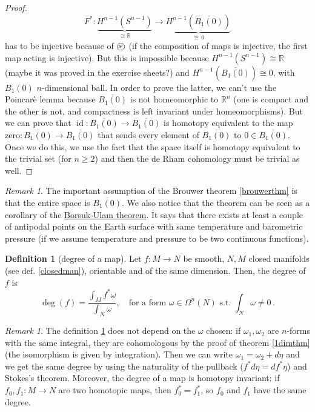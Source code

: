 \documentclass[a4paper,11pt,titlepage, article, oneside]{memoir}
\numberwithin{equation}{section}
\theoremstyle{definition}
\newtheorem{definition}[theorem]{Definition}
\theoremstyle{remark}
\newtheorem{remark}[theorem]{Remark}
\DeclareMathOperator{\id}{id}
\newcommand{\rfield}{\mathbb{R}}
\newcommand\oast{\stackMath\mathbin{\stackinset{c}{0ex}{c}{0ex}{\ast}{\bigcirc}}}
\begin{document}
\begin{proof}
$$F^* \colon \underbrace{H^{n-1}(S^{n-1})}_{\cong \rfield} \longrightarrow \underbrace{H^{n-1}(\overline{B_1(0)})}_{\cong \,0}$$
has to be injective because of $\oast$ (if the composition of maps is injective, the first map acting is injective). But this is impossible because $H^{n-1}(S^{n-1}) \cong \rfield$ (maybe it was proved in the exercise sheets?) and $H^{n-1}(\overline{B_1(0)}) \cong 0$, with $B_1(0)$ $n$-dimensional ball. In order to prove the latter, we can't use the Poincarè lemma because $\overline{B_1(0)}$ is not homeomorphic to $\rfield^n$ (one is compact and the other is not, and compactness is left invariant under homeomorphisms). But we can prove that $\id \colon \overline{B_1(0)} \rightarrow \overline{B_1(0)}$ is homotopy equivalent to the map $\text{zero} \colon \overline{B_1(0)} \rightarrow \overline{B_1(0)}$ that sends every element of $\overline{B_1(0)}$ to $0 \in \overline{B_1(0)}$. Once we do this, we use the fact that the space itself is homotopy equivalent to the trivial set (for $n \ge 2$) and then the de Rham cohomology must be trivial as well.
\end{proof}

\begin{remarkbox}\begin{remark}
The important assumption of the Brouwer theorem \ref{brouwerthm} is that the entire space is $\overline{B_1(0)}$. We also notice that the theorem can be seen as a corollary of the \href{https://en.wikipedia.org/wiki/Borsuk-Ulam_theorem}{Borsuk-Ulam theorem}. It says that there exists at least a couple of antipodal points on the Earth surface with same temperature and barometric pressure (if we assume temperature and pressure to be two continuous functions).
\end{remark}\end{remarkbox}

\begin{definition}[degree of a map] \label{degreemap}
Let $f \colon M \rightarrow  N$ be smooth, $N, M$ closed manifolds (see def.  \ref{closedman}), orientable and of the same dimension. Then, the degree of $f$ is
\begin{equation}
\deg(f) = \frac{\int_M f^* \omega}{\int_N \omega}, \quad \text{for a form } \omega \in \Omega^n(N) \text{ s.t. } \int_N\omega \not = 0 \, .
\end{equation}
\end{definition}

\begin{remarkbox}\begin{remark}
The definition \ref{degreemap} does not depend on the $\omega$ chosen: if $\omega_1, \omega_2$ are $n$-forms with the same integral, they are cohomologous by the proof of theorem \ref{1dimthm} (the isomorphism is given by integration). Then we can write $\omega_1 = \omega_2 + d\eta$ and we get the same degree by using the naturality of the pullback ($f^* d \eta = d f^* \eta$) and Stokes's theorem. Moreover, the degree of a map is homotopy invariant: if $f_0, f_1 \colon M \rightarrow N$ are two homotopic maps, then $f_0^* = f_1^*$, so $f_0$ and $f_1$ have the same degree.
\end{remark}\end{remarkbox}
\end{document}
